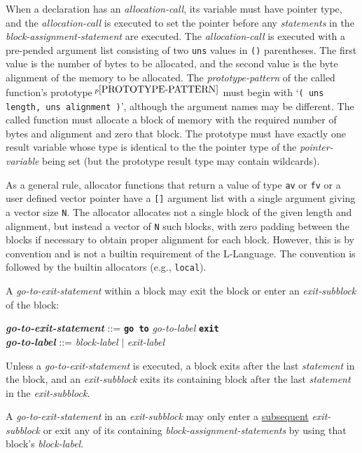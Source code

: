 \documentclass[12pt]{article}
\newcommand{\TT}[1]{{\tt \bfseries #1}}
\newcommand{\ttkey}[1]{{\tt \bfseries #1}}
\newcommand{\emkey}[1]{{\em \bfseries #1}}
\newcommand{\pagnote}[1]{$\,^{p\pageref{#1}}$}
\newenvironment{indpar}[1][0.3in]%
	{\begin{list}{}%
		     {\setlength{\itemsep}{0in}%
		      \setlength{\topsep}{0in}%
		      \setlength{\parsep}{1ex}%
		      \setlength{\labelwidth}{#1}%
		      \setlength{\leftmargin}{#1}%
		      \addtolength{\leftmargin}{\labelsep}}%
	 \item}%
	{\end{list}}
\begin{document}
When a declaration has an {\em allocation-call}\label{ALLOCATION-CALL},
its variable must have pointer
type, and the {\em allocation-call} is executed to set the pointer
before any {\em statements} in the {\em block-assignment-statement}
are executed.  The {\em allocation-call} is executed
with a pre-pended argument list consisting of two {\tt uns} values
in {\tt ()} parentheses.  The first value is the number of bytes to
be allocated, and the second value is the byte alignment of the
memory to be allocated.
The {\em prototype-pattern}
of the called function's prototype\pagnote{PROTOTYPE-PATTERN}
must begin with `{\tt ( uns length, uns alignment )}', although
the argument names may be different.
The called function must allocate a block of
memory with the required number of bytes and alignment and zero that
block.  The prototype must have
exactly one result variable whose type is identical to the
the pointer type of the {\em pointer-variable} being set (but the
prototype result type may contain wildcards).

As a general rule, allocator functions that return a value of
type {\tt av} or {\tt fv} or a user defined vector pointer
have a {\tt []} argument list
with a single argument giving a vector size {\tt N}.
The allocator allocates not a single block of the given length
and alignment, but instead a vector of {\tt N} such blocks, with zero padding
between the blocks if necessary to obtain proper alignment for each
block.  However,
this is by convention and is not a builtin requirement of the L-Language.
The convention is followed by the builtin allocators (e.g., {\tt local}).

A {\em go-to-exit-statement} within a block may exit the block or
enter an {\em exit-subblock} of the block:
\begin{indpar}
\emkey{go-to-exit-statement}\label{GO-TO-STATEMENT} ::=
    \ttkey{go to} {\em go-to-label} \TT{exit}
\\[0.5ex]
\emkey{go-to-label} ::= {\em block-label} $|$ {\em exit-label}
\end{indpar}

Unless a {\em go-to-exit-statement} is executed,
a block exits after the last {\em statement} in the block,
and an {\em exit-subblock} exits its containing block after the last
{\em statement} in the {\em exit-subblock}.

A {\em go-to-exit-statement} in an {\em exit-subblock} may only enter
a \underline{subsequent} {\em exit-subblock} or exit any of its containing
{\em block-assignment-statements} by using that block's {\em block-label}.
\end{document}
